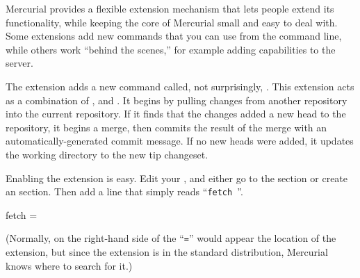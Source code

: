Mercurial provides a flexible extension mechanism that lets people
extend its functionality, while keeping the core of Mercurial small
and easy to deal with.  Some extensions add new commands that you can
use from the command line, while others work ``behind the scenes,''
for example adding capabilities to the server.

The  extension adds a new command called, not
surprisingly, .  This extension acts as a combination of
,  and .  It begins by pulling
changes from another repository into the current repository.  If it
finds that the changes added a new head to the repository, it begins a
merge, then commits the result of the merge with an
automatically-generated commit message.  If no new heads were added,
it updates the working directory to the new tip changeset.

Enabling the  extension is easy.  Edit your
, and either go to the  section
or create an  section.  Then add a line that
simply reads ``\Verb+fetch +''.
\begin{codesample2}
  [extensions]
  fetch =
\end{codesample2}
(Normally, on the right-hand side of the ``\texttt{=}'' would appear
the location of the extension, but since the  extension
is in the standard distribution, Mercurial knows where to search for
it.)


